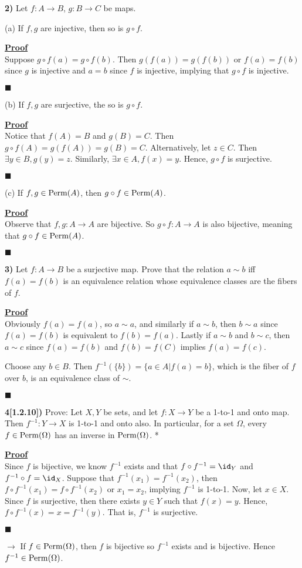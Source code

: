 \documentclass[12pt,a4paper]{article}
\newcommand{\prob}[2]{\textbf{#1)} #2}
\newenvironment{proof}
{
\textbf{\underline{Proof}} \\
}
{
\begin{flushright}
$\blacksquare$
\end{flushright}}
\begin{document}
\prob{2}{Let $f: A \rightarrow B$, $g: B \rightarrow C$ be maps.}

(a) If $f,g$ are injective, then so is $g \circ f$.

\begin{proof}
Suppose $g \circ f(a) = g \circ f(b)$. Then $g(f(a)) = g(f(b))$ or $f(a) = f(b)$ since $g$ is injective and $a = b$ since $f$ is injective, implying that $g \circ f$ is injective.
\end{proof}

(b) If $f,g$ are surjective, the so is $g \circ f$.

\begin{proof}
Notice that $f(A) = B$ and $g(B) = C$. Then $g \circ f(A) = g(f(A)) = g(B) = C$. Alternatively, let $z \in C$. Then $\exists y \in B, g(y) = z$. Similarly, $\exists x \in A, f(x) = y$. Hence, $g \circ f$ is surjective.
\end{proof}

(c) If $f,g \in {\rm Perm}(A)$, then $g \circ f \in {\rm Perm}(A)$.

\begin{proof}
Observe that $f,g: A \rightarrow A$ are bijective. So $g \circ f: A \rightarrow A$ is also bijective, meaning that $g \circ f \in {\rm Perm}(A)$.
\end{proof} 

\prob{3}{Let $f: A \rightarrow B$ be a surjective map. Prove that the relation $a \sim b$ iff $f(a) = f(b)$ is an equivalence relation whose equivalence classes are the fibers of $f$.}

\begin{proof}
Obviously $f(a) = f(a)$, so $a \sim a$, and similarly if $a \sim b$, then $b \sim a$ since $f(a) = f(b)$ is equivalent to $f(b) = f(a)$. Lastly if $a \sim b$ and $b \sim c$, then $a \sim c$ since $f(a) = f(b)$ and $f(b) = f(C)$ implies $f(a) = f(c)$.

Choose any $b \in B$. Then $f^{-1}(\{b\}) = \{a \in A | f(a) = b\}$, which is the fiber of $f$ over $b$, is an equivalence class of $\sim$.
\end{proof}

\prob{4[1.2.10]}{Prove: Let $X,Y$ be sets, and let $f: X \rightarrow Y$ be a 1-to-1 and onto map. Then $f^{-1}: Y \rightarrow X$ is 1-to-1 and onto also. In particular, for a set $\Omega$, every $f \in {\rm Perm}(\Omega)$ has an inverse in ${\rm Perm}(\Omega)$. *}

\begin{proof}
Since $f$ is bijective, we know $f^{-1}$ exists and that $f \circ f^{-1} = \id_{Y}$ and $f^{-1} \circ f = \id_{X}$. Suppose that $f^{-1}(x_1) = f^{-1}(x_2)$, then $f \circ f^{-1}(x_1) = f \circ f^{-1}(x_2)$ or $x_1 = x_2$, implying $f^{-1}$ is 1-to-1. Now, let $x \in X$. Since $f$ is surjective, then there exists $y \in Y$ such that $f(x) = y$. Hence, $f \circ f^{-1}(x) = x = f^{-1}(y)$. That is, $f^{-1}$ is surjective.
\end{proof}
$\rightarrow$ If $f \in {\rm Perm}(\Omega)$, then $f$ is bijective so $f^{-1}$ exists and is bijective. Hence $f^{-1} \in {\rm Perm}(\Omega)$.
\end{document}
